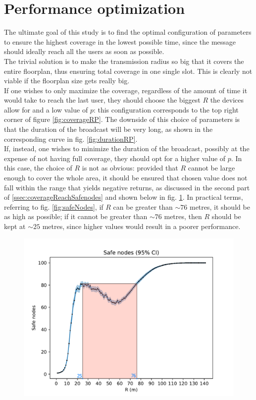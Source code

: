 \section{Performance optimization}
The ultimate goal of this study is to find the optimal configuration of parameters to ensure the highest coverage in the lowest possible time, since the message should ideally reach all the users as soon as possible.\\
The trivial solution is to make the transmission radius so big that it covers the entire floorplan, thus ensuring total coverage in one single slot.
This is clearly not viable if the floorplan size gets really big.\\
If one wishes to only maximize the coverage, regardless of the amount of time it would take to reach the last user, they should choose the biggest $R$ the devices allow for and a low value of $p$: this configuration corresponds to the top right corner of figure \ref{fig:coverageRP}. The downside of this choice of parameters is that the duration of the broadcast will be very long, as shown in the corresponding curve in fig. \ref{fig:durationRP}.\\
If, instead, one wishes to minimize the duration of the broadcast, possibly at the expense of not having full coverage, they should opt for a higher value of $p$. In this case, the choice of $R$ is not as obvious: provided that $R$ cannot be large enough to cover the whole area, it should be ensured that chosen value does not fall within the range that yields negative returns, as discussed in the second part of \ref{ssec:coverageReachSafenodes} and shown below in fig. \ref{fig:safeNodesShaded}. In practical terms, referring to fig. \ref{fig:safeNodes}, if $R$ can be greater than $\sim76$ metres, it should be as high as possible; if it cannot be greater than $\sim76$ metres, then $R$ should be kept at $\sim25$ metres, since higher values would result in a poorer performance.

\begin{figure}[H]
    \begin{center}
        \includegraphics[scale=0.7]{img/graphAnalysisSafe_nodesRed.png}
        \caption{}
        \label{fig:safeNodesShaded}
    \end{center}
    \vspace*{-0.8cm}
\end{figure}